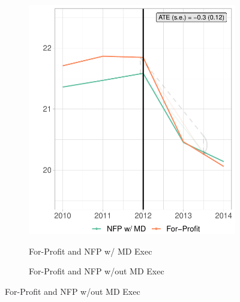 \documentclass[12pt]{article}
\begin{document}
 \begin{figure}[ht!]
     \caption{Readmission Rate Synthetic Difference in Differences Results}
     \centering
     \begin{subfigure}[b]{0.45\textwidth}
         \centering
         \caption{For-Profit and NFP w/ MD Exec}
         \includegraphics[width=\textwidth]{Objects/read_fp_md_synth_graph.pdf}
         \label{fig:read_synth_plotb}
     \end{subfigure}%
     \vspace{5mm}
     \hfill
     \begin{subfigure}[b]{0.45\textwidth}
         \centering
         \caption{For-Profit and NFP w/out MD Exec}

\end{subfigure}
\end{figure}
\end{document}
